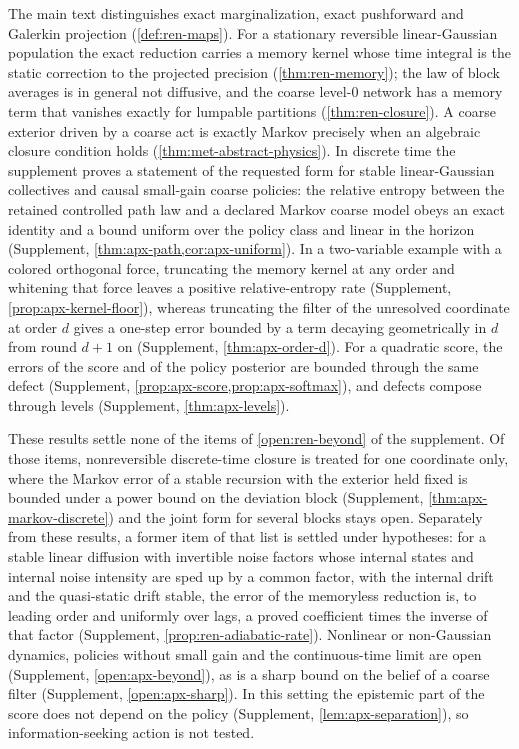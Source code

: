 The main text distinguishes exact marginalization, exact pushforward and Galerkin projection (\cref{def:ren-maps}). For a stationary reversible linear-Gaussian population the exact reduction carries a memory kernel whose time integral is the static correction to the projected precision (\cref{thm:ren-memory}); the law of block averages is in general not diffusive, and the coarse level-0 network has a memory term that vanishes exactly for lumpable partitions (\cref{thm:ren-closure}). A coarse exterior driven by a coarse act is exactly Markov precisely when an algebraic closure condition holds (\cref{thm:met-abstract-physics}). In discrete time the supplement proves a statement of the requested form for stable linear-Gaussian collectives and causal small-gain coarse policies: the relative entropy between the retained controlled path law and a declared Markov coarse model obeys an exact identity and a bound uniform over the policy class and linear in the horizon (Supplement, \cref{thm:apx-path,cor:apx-uniform}). In a two-variable example with a colored orthogonal force, truncating the memory kernel at any order and whitening that force leaves a positive relative-entropy rate (Supplement, \cref{prop:apx-kernel-floor}), whereas truncating the filter of the unresolved coordinate at order $d$ gives a one-step error bounded by a term decaying geometrically in $d$ from round $d+1$ on (Supplement, \cref{thm:apx-order-d}). For a quadratic score, the errors of the score and of the policy posterior are bounded through the same defect (Supplement, \cref{prop:apx-score,prop:apx-softmax}), and defects compose through levels (Supplement, \cref{thm:apx-levels}).

These results settle none of the items of \cref{open:ren-beyond} of the supplement. Of those items, nonreversible discrete-time closure is treated for one coordinate only, where the Markov error of a stable recursion with the exterior held fixed is bounded under a power bound on the deviation block (Supplement, \cref{thm:apx-markov-discrete}) and the joint form for several blocks stays open. Separately from these results, a former item of that list is settled under hypotheses: for a stable linear diffusion with invertible noise factors whose internal states and internal noise intensity are sped up by a common factor, with the internal drift and the quasi-static drift stable, the error of the memoryless reduction is, to leading order and uniformly over lags, a proved coefficient times the inverse of that factor (Supplement, \cref{prop:ren-adiabatic-rate}). Nonlinear or non-Gaussian dynamics, policies without small gain and the continuous-time limit are open (Supplement, \cref{open:apx-beyond}), as is a sharp bound on the belief of a coarse filter (Supplement, \cref{open:apx-sharp}). In this setting the epistemic part of the score does not depend on the policy (Supplement, \cref{lem:apx-separation}), so information-seeking action is not tested.

